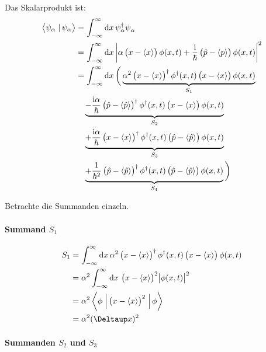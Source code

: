 Das Skalarprodukt ist:
\begin{align*}
	\braket{\psi_\alpha}{\psi_\alpha}
	&= \int_{-\infty}^\infty \dif x \, \psi_\alpha^\dagger \psi_\alpha^{} \\
	&= \int_{-\infty}^\infty \dif x \, \abs{\alpha \del{x - \bracket x} \phi(x, t) + \frac\ii\hbar \del{\hat p - \bracket p} \phi(x, t)}^2 \\
	&= \int_{-\infty}^\infty \dif x \, \bigg(
	\underbrace{
		\alpha^2
		\del{x - \bracket x}^\dagger \phi^\dagger(x, t)
		\del{x - \bracket x} \phi(x, t)
	}_{S_1} \\
	&\quad
	\underbrace{
	- \frac{\ii \alpha}\hbar
	\del{\hat p - \bracket{\hat p}}^\dagger \phi^\dagger(x, t)
	\del{x - \bracket x} \phi(x, t)
	}_{S_2} \\
	&\quad
	\underbrace{
	+ \frac{\ii \alpha}\hbar
	\del{x - \bracket x}^\dagger \phi^\dagger(x, t)
	\del{\hat p - \bracket{\hat p}} \phi(x, t)
	}_{S_3} \\
	&\quad
	\underbrace{
	+ \frac{1}{\hbar^2}
	\del{\hat p - \bracket{\hat p}}^\dagger \phi^\dagger(x, t)
	\del{\hat p - \bracket{\hat p}} \phi(x, t)
	}_{S_4}
	\bigg)
\end{align*}

Betrachte die Summanden einzeln.

\paragraph{Summand $S_1$}

\begin{align*}
	S_1
	&= \int_{-\infty}^\infty \dif x \, \alpha^2 \del{x - \bracket x}^\dagger \phi^\dagger(x, t) \del{x - \bracket x} \phi(x, t) \\
	&= \alpha^2 \int_{-\infty}^\infty \dif x \, \del{x - \bracket x}^2  \abs{\phi(x, t)}^2 \\
	&= \alpha^2 \braproket\phi{\del{x - \bracket x}^2}\phi \\
	&= \alpha^2 (\Deltaup x)^2
\end{align*}

\paragraph{Summanden $S_2$ und $S_3$}

